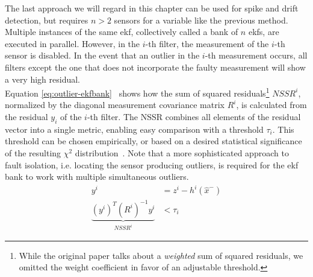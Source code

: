 The last approach we will regard in this chapter can be used for spike and drift detection, but requires $n>2$ sensors for a variable like the previous method. Multiple instances of the same \gls{ekf}, collectively called a bank of $n$ \gls{ekf}s, are executed in parallel. However, in the $i$-th filter, the measurement of the $i$-th sensor is disabled. In the event that an outlier in the $i$-th measurement occurs, all filters except the one that does not incorporate the faulty measurement will show a very high residual. \\ Equation \ref{eq:outlier-ekfbank}~\cite[p.~3]{Kobayashi.2003} shows how the sum of squared residuals\footnote{While the original paper talks about a \textit{weighted} sum of squared residuals, we omitted the weight coefficient in favor of an adjustable threshold.} $\textit{NSSR}^i$, normalized by the diagonal measurement covariance matrix $R^i$, is calculated from the residual $y_i$ of the $i$-th filter. The NSSR combines all elements of the residual vector into a single metric, enabling easy comparison with a threshold $\tau_i$. This threshold can be chosen empirically, or based on a desired statistical significance of the resulting $\chi^2$ distribution~\cite[p.~3]{Xue.2007}. Note that a more sophisticated approach to fault isolation, i.e. locating the sensor producing outliers, is required for the \gls{ekf} bank to work with multiple simultaneous outliers.
\begin{subequations}\label{eq:outlier-ekfbank}
\begin{alignat}{2}%
y^i &= z^i - h^i(\hat{x}^-) \\%
\underbrace{(y^i)^T (R^i)^{-1} y^i}_\textrm{$\textit{NSSR}^i$} &< \tau_i%
\end{alignat}
\end{subequations}
